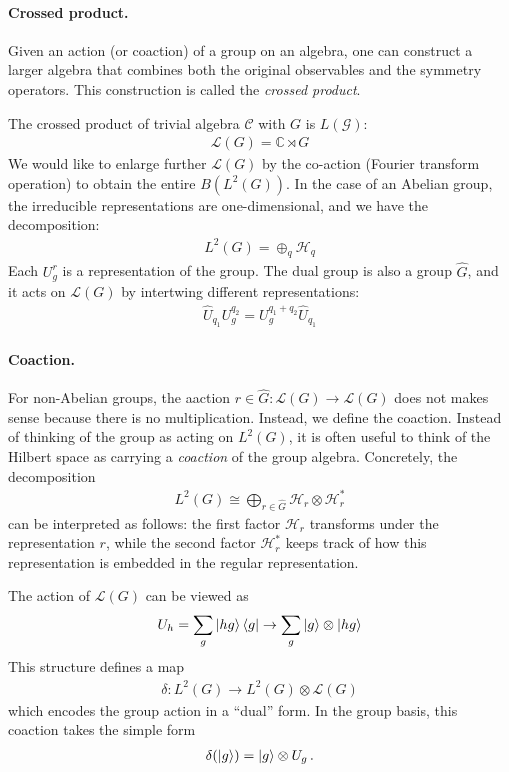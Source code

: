 \documentclass{article}
\newcommand{\mH}{\mathcal{H}}
\theoremstyle{definition}
\begin{document}
\paragraph{Crossed product.}
Given an action (or coaction) of a group on an algebra, one can construct a larger algebra that combines both the original observables and the symmetry operators. This construction is called the \emph{crossed product}.

The crossed product of trivial algebra $\mathcal{C}$ with $G$ is $L(\mathcal{G})$:
\begin{align}
    \mathcal{L}(G)=\mathbb{C}\rtimes G
\end{align}
We would like to enlarge further $\mathcal{L}(G)$ by the co-action (Fourier transform operation) to obtain the entire $B(L^2(G))$. In the case of an Abelian group, the irreducible representations are one-dimensional, and we have the decomposition:
\begin{align}
    L^2(G)=\oplus_q \mH_q
\end{align}
Each $U^r_g$ is a representation of the group. The dual group is also a group $\hat{G}$, and it acts on $\mathcal{L}(G)$ by intertwing different representations:
\begin{align}
    \hat{U}_{q_1}U^{q_2}_g=U^{q_1+q_2}_g \hat{U}_{q_1}
\end{align}

\paragraph{Coaction.} For non-Abelian groups, the aaction $r\in\hat{G}: \mathcal{L}(G)\to \mathcal{L}(G)$ does not makes sense because there is no multiplication. Instead, we define the coaction. Instead of thinking of the group as acting on \(L^2(G)\), it is often useful to think of the Hilbert space as carrying a \emph{coaction} of the group algebra. Concretely, the decomposition
\begin{align}
L^2(G) \cong \bigoplus_{r \in \hat G} \mH_r \otimes \mH_r^*
\end{align}
can be interpreted as follows: the first factor \(\mH_r\) transforms under the representation \(r\), while the second factor \(\mH_r^*\) keeps track of how this representation is embedded in the regular representation.

The action of $\mathcal{L}(G)$ can be viewed as 
\begin{align}
    U_h=\sum_g\ket{h g}\bra{g}\to  \sum_g \ket{g}\otimes \ket{h g}
\end{align}
This structure defines a map
\begin{align}
\delta : L^2(G) \to L^2(G) \otimes \mathcal{L}(G)
\end{align}
which encodes the group action in a ``dual'' form. In the group basis, this coaction takes the simple form
\begin{align}
\delta(\ket{g}) = \ket{g} \otimes U_g \,.
\end{align}
\end{document}
